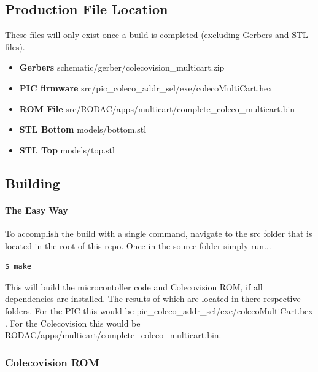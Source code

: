 \documentclass{article}
\begin{document}
  \subsection{Production File Location}

  \par
  These files will only exist once a build is completed (excluding Gerbers and STL files).

  \begin{itemize}
    \item \textbf{Gerbers} schematic/gerber/colecovision\_multicart.zip
    \item \textbf{PIC firmware} src/pic\_coleco\_addr\_sel/exe/colecoMultiCart.hex
    \item \textbf{ROM File} src/RODAC/apps/multicart/complete\_coleco\_multicart.bin
    \item \textbf{STL Bottom} models/bottom.stl
    \item \textbf{STL Top} models/top.stl
  \end{itemize}

  \subsection{Building}

  \par
  \paragraph{The Easy Way} To accomplish the build with a single command, navigate to the src folder that is located in the root of this repo. Once in the source folder simply run...

  \begin{lstlisting}[language=bash]
    $ make
  \end{lstlisting}

  This will build the microcontoller code and Colecovision ROM, if all dependencies are installed. The results of which are located in there respective folders. For the PIC this would be
  pic\_coleco\_addr\_sel/exe/colecoMultiCart.hex . For the Colecovision this would be RODAC/apps/multicart/complete\_coleco\_multicart.bin.

  \subsubsection{Colecovision ROM}
\end{document}
